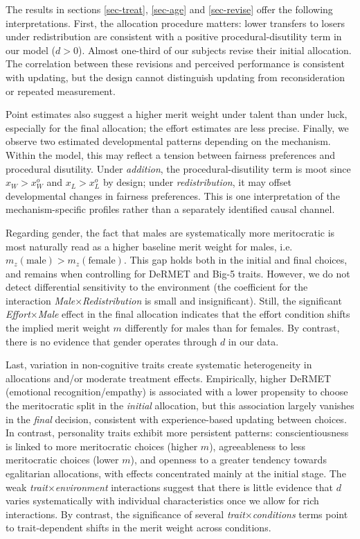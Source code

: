\documentclass[11pt]{article}
\begin{document}
The results in sections \ref{sec-treat}, \ref{sec-age} and \ref{sec-revise} offer the following interpretations. First, the allocation procedure matters: lower transfers to losers under redistribution are consistent with a positive procedural-disutility term in our model ($d>0$). Almost one-third of our subjects revise their initial allocation. The correlation between these revisions and perceived performance is consistent with updating, but the design cannot distinguish updating from reconsideration or repeated measurement.


Point estimates also suggest a higher merit weight under talent than under luck, especially for the final allocation; the effort estimates are less precise.
Finally, we observe two estimated developmental patterns depending on the mechanism. Within the model, this may reflect a tension between fairness preferences and procedural disutility. Under \emph{addition}, the procedural-disutility term is moot since $x_W>x_W^o$ and $x_L>x_L^o$ by design; under \emph{redistribution}, it may offset developmental changes in fairness preferences. This is one interpretation of the mechanism-specific profiles rather than a separately identified causal channel.

Regarding gender, the fact that males are systematically more meritocratic is most naturally read as a higher baseline merit weight for males, i.e. $m_z(\textrm{male})>m_z(\textrm{female})$. This gap holds both in the initial and final choices, and remains when controlling for DeRMET and Big-5 traits. However, we do not detect differential sensitivity to the environment (the coefficient for the interaction \emph{Male}$\times$\emph{Redistribution} is small and insignificant). Still, the significant \emph{Effort}$\times$\emph{Male} effect in the final allocation indicates that the effort condition shifts the implied merit weight $m$ differently for males than for females. By contrast, there is no evidence that gender operates through $d$ in our data.
 

Last, variation in non-cognitive traits create systematic heterogeneity in allocations and/or moderate treatment effects. 
Empirically, higher DeRMET (emotional recognition/empathy) is associated with a lower propensity to choose the meritocratic split in the \emph{initial} allocation, but this association largely vanishes in the \emph{final} decision, consistent with experience-based updating between choices. In contrast, personality traits exhibit more persistent patterns: conscientiousness is linked to more meritocratic choices (higher $m$), agreeableness to less meritocratic choices (lower $m$), and openness to a greater tendency towards egalitarian allocations, with effects concentrated mainly at the initial stage. 
The weak \emph{trait}$\times$\emph{environment} interactions suggest that there is little evidence that $d$ varies systematically with individual characteristics once we allow for rich interactions. By contrast, the significance of several \emph{trait}$\times$\emph{conditions} terms point to 
trait-dependent shifts in the merit weight across conditions. 
\end{document}
